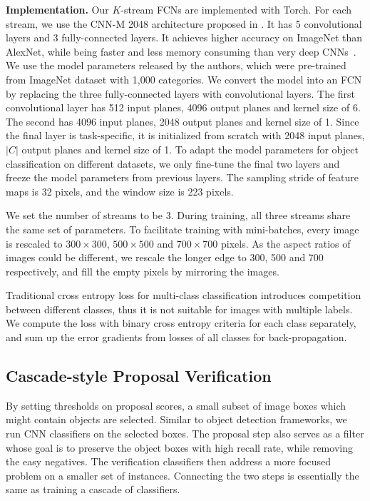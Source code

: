 \documentclass[10pt,twocolumn,letterpaper]{article}
\begin{document}
\textbf{Implementation.} Our $K$-stream FCNs are implemented with Torch. For each stream, we use the CNN-M 2048 architecture proposed in \cite{DBLP:journals/corr/ChatfieldSVZ14}. It has 5 convolutional layers and 3 fully-connected layers. It achieves higher accuracy on ImageNet than AlexNet, while being faster and less memory consuming than very deep CNNs~\cite{Simonyan14c}. We use the model parameters released by the authors, which were pre-trained from ImageNet dataset with 1,000 categories. We convert the model into an FCN by replacing the three fully-connected layers with convolutional layers. The first convolutional layer has 512 input planes, 4096 output planes and kernel size of 6. The second has 4096 input planes, 2048 output planes and kernel size of 1. Since the final layer is task-specific, it is initialized from scratch with 2048 input planes, $|C|$ output planes and kernel size of 1. To adapt the model parameters for object classification on different datasets, we only fine-tune the final two layers and freeze the model parameters from previous layers. The sampling stride of feature maps is 32 pixels, and the  window size is 223 pixels.

We set the number of streams to be 3. During training, all three streams share the same set of parameters. To facilitate training with mini-batches, every image is rescaled to $300\times 300$, $500\times 500$ and $700\times 700$ pixels. As the aspect ratios of images could be different, we rescale the longer edge to 300, 500 and 700 respectively, and fill the empty pixels by mirroring the images. 

Traditional cross entropy loss for multi-class classification introduces competition between different classes, thus it is not suitable for images with multiple labels. We compute the loss with binary cross entropy criteria for each class separately, and sum up the error gradients from losses of all classes for back-propagation. 

\subsection{Cascade-style Proposal Verification}
By setting thresholds on proposal scores, a small subset of image boxes which might contain objects are selected. Similar to object detection frameworks, we run CNN classifiers on the selected boxes. The proposal step also serves as a filter whose goal is to preserve the object boxes with high recall rate, while removing the easy negatives. The verification classifiers then address a more focused problem on a smaller set of instances. Connecting the two steps is essentially the same as training a cascade of classifiers.
\end{document}
